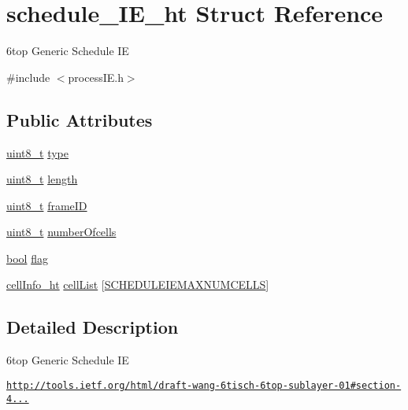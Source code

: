 \hypertarget{structschedule___i_e__ht}{}\section{schedule\+\_\+\+I\+E\+\_\+ht Struct Reference}
\label{structschedule___i_e__ht}


6top Generic Schedule IE  




{\ttfamily \#include $<$process\+I\+E.\+h$>$}

\subsection*{Public Attributes}
\begin{DoxyCompactItemize}
\item 
\hyperlink{_p_e___types_8h_aba7bc1797add20fe3efdf37ced1182c5}{uint8\+\_\+t} \hyperlink{structschedule___i_e__ht_a2629235d8fc16eac19c0040bb068b945}{type}
\item 
\hyperlink{_p_e___types_8h_aba7bc1797add20fe3efdf37ced1182c5}{uint8\+\_\+t} \hyperlink{structschedule___i_e__ht_afddbf069128e7213406ddde0fb0327f1}{length}
\item 
\hyperlink{_p_e___types_8h_aba7bc1797add20fe3efdf37ced1182c5}{uint8\+\_\+t} \hyperlink{structschedule___i_e__ht_a0eb064215038e5c6af6cf9663ffea2d3}{frame\+ID}
\item 
\hyperlink{_p_e___types_8h_aba7bc1797add20fe3efdf37ced1182c5}{uint8\+\_\+t} \hyperlink{structschedule___i_e__ht_a0793e8247d7c11166539765305911d48}{number\+Ofcells}
\item 
\hyperlink{_p_e___types_8h_a97a80ca1602ebf2303258971a2c938e2}{bool} \hyperlink{structschedule___i_e__ht_a5acbeb55ef84420e4d808f378ac30d39}{flag}
\item 
\hyperlink{structcell_info__ht}{cell\+Info\+\_\+ht} \hyperlink{structschedule___i_e__ht_add67be7b2b97529b8ac1c377b29b761b}{cell\+List} \mbox{[}\hyperlink{process_i_e_8h_ade3a486a2f916d978156d61847673813}{S\+C\+H\+E\+D\+U\+L\+E\+I\+E\+M\+A\+X\+N\+U\+M\+C\+E\+L\+LS}\mbox{]}
\end{DoxyCompactItemize}


\subsection{Detailed Description}
6top Generic Schedule IE 

\href{http://tools.ietf.org/html/draft-wang-6tisch-6top-sublayer-01#section-4.1.1.8}{\tt http\+://tools.\+ietf.\+org/html/draft-\/wang-\/6tisch-\/6top-\/sublayer-\/01\#section-\/4...} 


